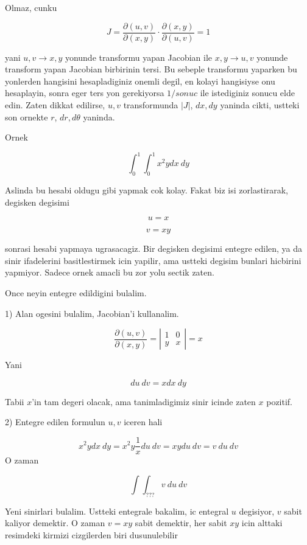 \documentclass[12pt,fleqn]{article}
\begin{document}
Olmaz, cunku 

\[ J = \frac{\partial (u,v)}{\partial(x,y)} \cdot
\frac{\partial (x,y)}{\partial(u,v)} = 1
 \]

yani $u,v \to x,y$ yonunde transformu yapan Jacobian ile $x,y \to u,v$
yonunde transform yapan Jacobian birbirinin tersi. Bu sebeple transformu
yaparken bu yonlerden hangisini hesapladiginiz onemli degil, en kolayi
hangisiyse onu hesaplayin, sonra eger ters yon gerekiyorsa $1 / sonuc$ ile
istediginiz sonucu elde edin. Zaten dikkat edilirse, $u,v$ transformunda
$|J|$, $dx,dy$ yaninda cikti, ustteki son ornekte $r$, $dr,d\theta$
yaninda. 

Ornek

\[ \int_0^1 \int_0^1 x^2y dx \ dy  \]

Aslinda bu hesabi oldugu gibi yapmak cok kolay. Fakat biz isi
zorlastirarak, degisken degisimi

\[ u =x  \]

\[ v = xy \]

sonrasi hesabi yapmaya ugrasacagiz. Bir degisken degisimi entegre edilen,
ya da sinir ifadelerini basitlestirmek icin yapilir, ama ustteki degisim
bunlari hicbirini yapmiyor. Sadece ornek amacli bu zor yolu sectik zaten. 

Once neyin entegre edildigini bulalim. 

1) Alan ogesini bulalim, Jacobian'i kullanalim. 

\[ \frac{\partial (u,v)}{\partial(x,y)}  = 
\left|\begin{array}{rr}
1 & 0 \\
y & x
\end{array}\right| = 
x
 \]

Yani

\[ du \ dv = x dx \ dy \]

Tabii $x$'in tam degeri olacak, ama tanimladigimiz sinir icinde zaten $x$
pozitif. 

2) Entegre edilen formulun $u,v$ iceren hali 

\[ x^2y dx \ dy =  x^2y  \frac{1}{x} du \ dv = 
xy du \ dv = 
v \ du \ dv 
\]
O zaman 

\[ \int \int _{???} v \ du \ dv \]

Yeni sinirlari bulalim. Ustteki entegrale bakalim, ic entegral $u$
degisiyor, $v$ sabit kaliyor demektir. O zaman $v=xy$ sabit demektir, her
sabit $xy$ icin alttaki resimdeki kirmizi cizgilerden biri dusunulebilir
\end{document}
